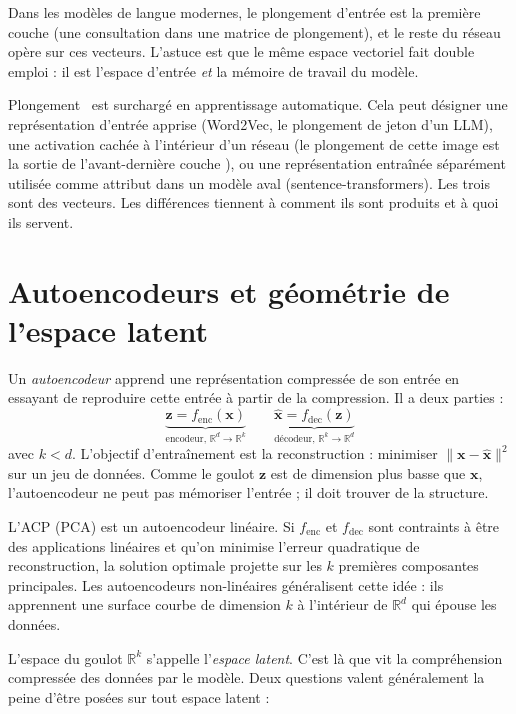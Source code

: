 Dans les modèles de langue modernes, le plongement d'entrée est la première couche (une consultation dans une matrice de plongement), et le reste du réseau opère sur ces vecteurs. L'astuce est que le même espace vectoriel fait double emploi : il est l'espace d'entrée \emph{et} la mémoire de travail du modèle.

\begin{warningbox}
\og Plongement \fg\ est surchargé en apprentissage automatique. Cela peut désigner une représentation d'entrée apprise (Word2Vec, le plongement de jeton d'un LLM), une activation cachée à l'intérieur d'un réseau (\og le plongement de cette image est la sortie de l'avant-dernière couche \fg), ou une représentation entraînée séparément utilisée comme attribut dans un modèle aval (sentence-transformers). Les trois sont des vecteurs. Les différences tiennent à comment ils sont produits et à quoi ils servent.
\end{warningbox}

\section{Autoencodeurs et géométrie de l'espace latent}

Un \emph{autoencodeur} apprend une représentation compressée de son entrée en essayant de reproduire cette entrée à partir de la compression. Il a deux parties :
\[
\underbrace{\bm{z} = f_{\text{enc}}(\bm{x})}_{\text{encodeur, } \mathbb{R}^d \to \mathbb{R}^k} \qquad \underbrace{\hat{\bm{x}} = f_{\text{dec}}(\bm{z})}_{\text{décodeur, } \mathbb{R}^k \to \mathbb{R}^d}
\]
avec $k < d$. L'objectif d'entraînement est la reconstruction : minimiser $\|\bm{x} - \hat{\bm{x}}\|^2$ sur un jeu de données. Comme le goulot $\bm{z}$ est de dimension plus basse que $\bm{x}$, l'autoencodeur ne peut pas mémoriser l'entrée ; il doit trouver de la structure.

\begin{intuition}
L'ACP (PCA) est un autoencodeur linéaire. Si $f_{\text{enc}}$ et $f_{\text{dec}}$ sont contraints à être des applications linéaires et qu'on minimise l'erreur quadratique de reconstruction, la solution optimale projette sur les $k$ premières composantes principales. Les autoencodeurs non-linéaires généralisent cette idée : ils apprennent une surface courbe de dimension $k$ à l'intérieur de $\mathbb{R}^d$ qui épouse les données.
\end{intuition}

L'espace du goulot $\mathbb{R}^k$ s'appelle l'\emph{espace latent}. C'est là que vit la compréhension compressée des données par le modèle. Deux questions valent généralement la peine d'être posées sur tout espace latent :

